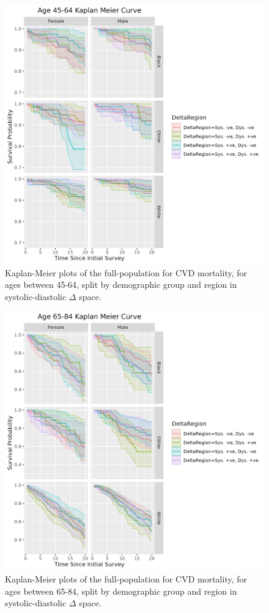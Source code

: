 \documentclass[
]{article}
\begin{document}
\begin{figure}
\hypertarget{fig:KM45_deltaregion}{%
\centering
\includegraphics{./Rmarkdown_Plots/SurvProbKM_Delta_45-65.png}
\caption{Kaplan-Meier plots of the full-population for CVD mortality, for ages between 45-64, split by demographic group and region in systolic-diastolic \(\Delta\) space.}\label{fig:KM45_deltaregion}
}
\end{figure}

\begin{figure}
\hypertarget{fig:KM65_deltaregion}{%
\centering
\includegraphics{./Rmarkdown_Plots/SurvProbKM_Delta_65-85.png}
\caption{Kaplan-Meier plots of the full-population for CVD mortality, for ages between 65-84, split by demographic group and region in systolic-diastolic \(\Delta\) space.}\label{fig:KM65_deltaregion}
}
\end{figure}
\end{document}
